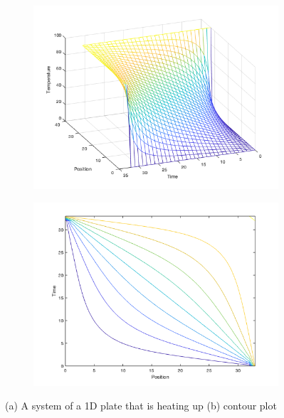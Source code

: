 \documentclass[12pt]{article}
\begin{document}
\begin{figure}[h!]
\centering

\begin{subfigure}{0.49\columnwidth}
\centering
\includegraphics[width=\textwidth]{problem1_3.png}
\label{fig:time1}
\end{subfigure}\hfill
\begin{subfigure}{0.49\columnwidth}
\centering
\includegraphics[width=\textwidth]{problem1_4.png}
\end{subfigure}
\caption{(a) A system of a 1D plate that is heating up (b) contour plot}
\end{figure}

\clearpage
\end{document}
